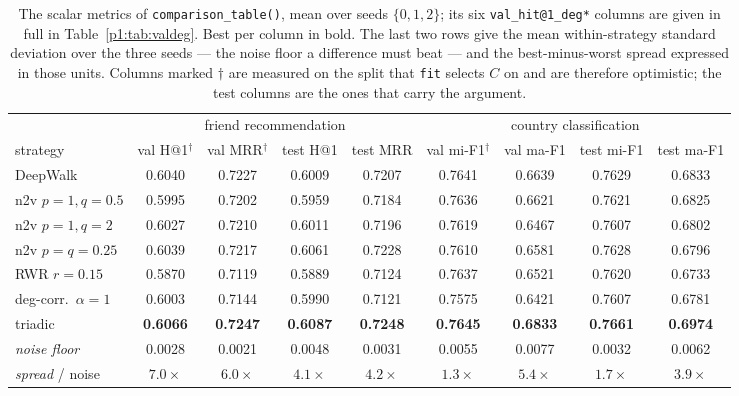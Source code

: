 \begin{table}[H]
\centering\footnotesize
\caption{The scalar metrics of \texttt{comparison\_table()}, mean over seeds
$\{0,1,2\}$; its six \texttt{val\_hit@1\_deg*} columns are given in full in
Table~\ref{p1:tab:valdeg}.  Best per column in bold.  The last two rows give the mean
within-strategy standard deviation over the three seeds --- the noise floor a difference
must beat --- and the best-minus-worst spread expressed in those units.  Columns marked
$\dagger$ are measured on the split that \texttt{fit} selects $C$ on and are therefore
optimistic; the test columns are the ones that carry the argument.}
\label{p1:tab:comparison}
\setlength{\tabcolsep}{3.2pt}
\begin{tabular}{@{}lcccccccc@{}}
\toprule
& \multicolumn{4}{c}{friend recommendation} & \multicolumn{4}{c}{country classification} \\
\cmidrule(lr){2-5}\cmidrule(lr){6-9}
strategy & val H@1$^\dagger$ & val MRR$^\dagger$ & test H@1 & test MRR & val mi-F1$^\dagger$ & val ma-F1 & test mi-F1 & test ma-F1 \\
\midrule
DeepWalk & 0.6040 & 0.7227 & 0.6009 & 0.7207 & 0.7641 & 0.6639 & 0.7629 & 0.6833 \\
n2v $p{=}1,q{=}0.5$ & 0.5995 & 0.7202 & 0.5959 & 0.7184 & 0.7636 & 0.6621 & 0.7621 & 0.6825 \\
n2v $p{=}1,q{=}2$ & 0.6027 & 0.7210 & 0.6011 & 0.7196 & 0.7619 & 0.6467 & 0.7607 & 0.6802 \\
n2v $p{=}q{=}0.25$ & 0.6039 & 0.7217 & 0.6061 & 0.7228 & 0.7610 & 0.6581 & 0.7628 & 0.6796 \\
RWR $r{=}0.15$ & 0.5870 & 0.7119 & 0.5889 & 0.7124 & 0.7637 & 0.6521 & 0.7620 & 0.6733 \\
deg-corr.\ $\alpha{=}1$ & 0.6003 & 0.7144 & 0.5990 & 0.7121 & 0.7575 & 0.6421 & 0.7607 & 0.6781 \\
triadic & \textbf{0.6066} & \textbf{0.7247} & \textbf{0.6087} & \textbf{0.7248} & \textbf{0.7645} & \textbf{0.6833} & \textbf{0.7661} & \textbf{0.6974} \\
\midrule
\textit{noise floor} & 0.0028 & 0.0021 & 0.0048 & 0.0031 & 0.0055 & 0.0077 & 0.0032 & 0.0062 \\
\textit{spread} / noise & $7.0\times$ & $6.0\times$ & $4.1\times$ & $4.2\times$ & $1.3\times$ & $5.4\times$ & $1.7\times$ & $3.9\times$ \\
\bottomrule
\end{tabular}
\end{table}

